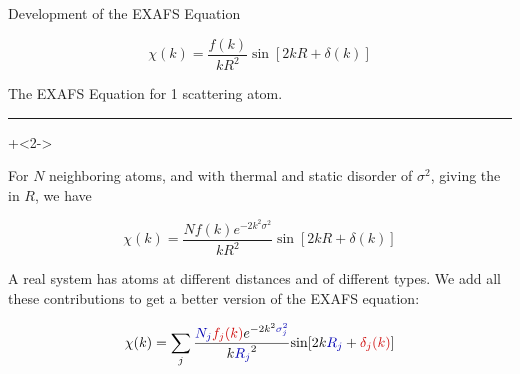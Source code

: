 \begin{slide}{Development of the EXAFS Equation}

    \[ \chi(k) = \frac{f(k)}{kR^2} {\sin[{2kR + \delta(k)}]} \]

    \vmm
    The EXAFS Equation for 1 scattering atom.

    \vmm\vmm \hrule \vmm \vmm

    \onslide+<2->

    For $N$ neighboring atoms, and with thermal and static disorder of
    $\sigma^2$, giving the {} in ${R}$, we
    have

    \[ \chi(k) = \frac{N f(k) e^{-2k^2\sigma^2}}{kR^2} \sin{[2kR + \delta(k)]} \]


    A real system has atoms at different distances and of different types.
    We add all these contributions to get a better version of the EXAFS
    equation:

      \vspace{2mm}

      \begin{center}
        \begin{postitbox}{77mm}
    \[ \chi(k) = \sum_j {\frac{{\Blue{N_j}} {\Red{f_j(k)}}
        e^{-2k^2{\Blue{\sigma_j^2}}}}{k{\Blue{R_j}}^2}
      {\sin[{2k{\Blue{R_j}} + {\Red{\delta_j(k)}}] }}} \]
  \end{postitbox}
      \end{center}

\vfill


\end{slide}
